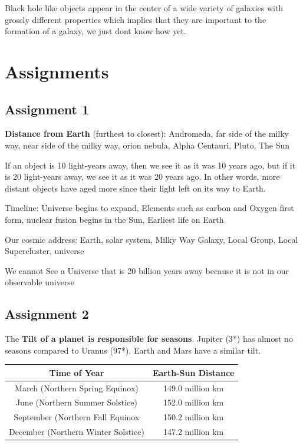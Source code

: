 \documentclass[12pt]{article}
\begin{document}
Black hole like objects appear in the center of a wide variety of galaxies with grossly different properties which implies that they are important to the formation of a galaxy, we just dont know how yet.











\section{Assignments}
\subsection{Assignment 1}
{\bf Distance from Earth} (furthest to closest): Andromeda, far side of the milky way, near side of the milky way, orion nebula, Alpha Centauri, Pluto, The Sun

If an object is 10 light-years away, then we see it as it was 10 years ago, but if it is 20 light-years away, we see it as it was 20 years ago. In other words, more distant objects have aged more since their light left on its way to Earth.

Timeline: Universe begins to expand, Elements such as carbon and Oxygen first form, nuclear fusion begins in the Sun, Earliest life on Earth

Our cosmic address: Earth, solar system, Milky Way Galaxy, Local Group, Local Supercluster, universe

We cannot See a Universe that is 20 billion years away because it is not in our observable universe

\subsection{Assignment 2}
The {\bf Tilt of a planet is responsible for seasons}. Jupiter (3*) has almost no seasons compared to Uranus (97*). Earth and Mars have a similar tilt.


\begin{tabular}{|c|c|}
\hline
Time of Year & Earth-Sun Distance \\ \hline
March (Northern Spring Equinox) & 149.0 million km\\
June (Northern Summer Solstice) & 152.0 million km\\
September (Northern Fall Equinox & 150.2 million km\\
December (Northern Winter Solstice) & 147.2 million km\\ \hline
\end{tabular}
\end{document}
